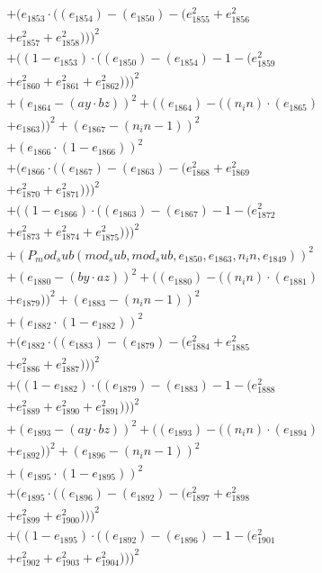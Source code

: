 \documentclass[10pt, a4paper]{article}
\begin{document}
\begin{align*}
& + (e_{1853}  \cdot  ((e_{1854}) - (e_{1850}) - (e_{1855}^{2} + e_{1856}^{2} \\
& + e_{1857}^{2} + e_{1858}^{2})))^{2} \\
& + ((1 - e_{1853})  \cdot  ((e_{1850}) - (e_{1854}) - 1 - (e_{1859}^{2} \\
& + e_{1860}^{2} + e_{1861}^{2} + e_{1862}^{2})))^{2} \\
& + (e_{1864} - (ay  \cdot  bz))^{2} + ((e_{1864}) - ((n_in)  \cdot  (e_{1865}) \\
& + e_{1863}))^{2} + (e_{1867} - (n_in - 1))^{2} \\
& + (e_{1866}  \cdot  (1 - e_{1866}))^{2} \\
& + (e_{1866}  \cdot  ((e_{1867}) - (e_{1863}) - (e_{1868}^{2} + e_{1869}^{2} \\
& + e_{1870}^{2} + e_{1871}^{2})))^{2} \\
& + ((1 - e_{1866})  \cdot  ((e_{1863}) - (e_{1867}) - 1 - (e_{1872}^{2} \\
& + e_{1873}^{2} + e_{1874}^{2} + e_{1875}^{2})))^{2} \\
& + (P_mod_sub(mod_sub, mod_sub, e_{1850}, e_{1863}, n_in, e_{1849}))^{2} \\
& + (e_{1880} - (by  \cdot  az))^{2} + ((e_{1880}) - ((n_in)  \cdot  (e_{1881}) \\
& + e_{1879}))^{2} + (e_{1883} - (n_in - 1))^{2} \\
& + (e_{1882}  \cdot  (1 - e_{1882}))^{2} \\
& + (e_{1882}  \cdot  ((e_{1883}) - (e_{1879}) - (e_{1884}^{2} + e_{1885}^{2} \\
& + e_{1886}^{2} + e_{1887}^{2})))^{2} \\
& + ((1 - e_{1882})  \cdot  ((e_{1879}) - (e_{1883}) - 1 - (e_{1888}^{2} \\
& + e_{1889}^{2} + e_{1890}^{2} + e_{1891}^{2})))^{2} \\
& + (e_{1893} - (ay  \cdot  bz))^{2} + ((e_{1893}) - ((n_in)  \cdot  (e_{1894}) \\
& + e_{1892}))^{2} + (e_{1896} - (n_in - 1))^{2} \\
& + (e_{1895}  \cdot  (1 - e_{1895}))^{2} \\
& + (e_{1895}  \cdot  ((e_{1896}) - (e_{1892}) - (e_{1897}^{2} + e_{1898}^{2} \\
& + e_{1899}^{2} + e_{1900}^{2})))^{2} \\
& + ((1 - e_{1895})  \cdot  ((e_{1892}) - (e_{1896}) - 1 - (e_{1901}^{2} \\
& + e_{1902}^{2} + e_{1903}^{2} + e_{1904}^{2})))^{2} \\

\end{align*}
\end{document}
